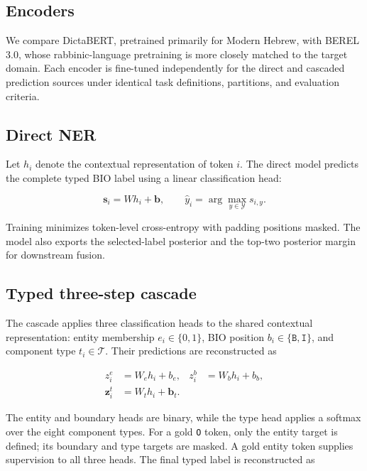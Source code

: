 \documentclass[conference,a4paper]{IEEEtran}
\begin{document}
\subsection{Encoders}

We compare DictaBERT, pretrained primarily for Modern Hebrew, with BEREL 3.0, whose rabbinic-language pretraining is more closely matched to the target domain. Each encoder is fine-tuned independently for the direct and cascaded prediction sources under identical task definitions, partitions, and evaluation criteria.

\subsection{Direct NER}

Let $h_i$ denote the contextual representation of token $i$. The direct model predicts the complete typed BIO label using a linear classification head:

\begin{equation}
  \mathbf{s}_i=W h_i+\mathbf{b},\qquad
  \hat y_i=\arg\max_{y\in\mathcal Y}s_{i,y}.
\end{equation}

Training minimizes token-level cross-entropy with padding positions masked. The model also exports the selected-label posterior and the top-two posterior margin for downstream fusion.

\subsection{Typed three-step cascade}

The cascade applies three classification heads to the shared contextual representation: entity membership $e_i\in\{0,1\}$, BIO position $b_i\in\{\texttt{B},\texttt{I}\}$, and component type $t_i\in\mathcal T$. Their predictions are reconstructed as

\begin{equation}
\begin{aligned}
z_i^{e}&=W_eh_i+b_e, &
z_i^{b}&=W_bh_i+b_b,\\
\mathbf z_i^{t}&=W_th_i+\mathbf b_t.
\end{aligned}
\end{equation}

The entity and boundary heads are binary, while the type head applies a softmax over the eight component types. For a gold \texttt{O} token, only the entity target is defined; its boundary and type targets are masked. A gold entity token supplies supervision to all three heads. The final typed label is reconstructed as
\end{document}
